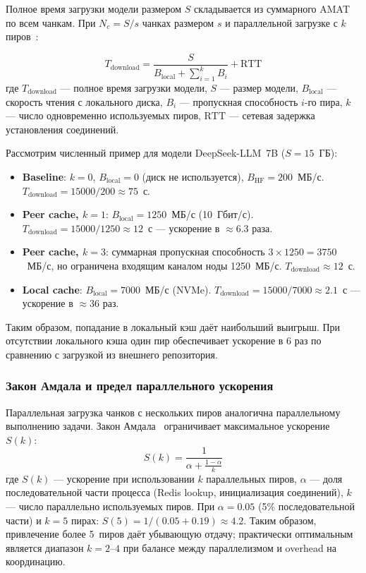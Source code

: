 Полное время загрузки модели размером $S$ складывается из суммарного AMAT по всем чанкам. При $N_c = S / s$ чанках размером $s$ и параллельной загрузке с $k$ пиров~\cite{li2020caching}:

\begin{equation}
  T_{\mathrm{download}} = \frac{S}{B_{\mathrm{local}} + \sum_{i=1}^{k} B_i} + \mathrm{RTT}
  \label{eq:p2p}
\end{equation}
где $T_{\mathrm{download}}$ --- полное время загрузки модели, $S$ --- размер модели, $B_{\mathrm{local}}$ --- скорость чтения с локального диска, $B_i$ --- пропускная способность $i$-го пира, $k$ --- число одновременно используемых пиров, $\mathrm{RTT}$ --- сетевая задержка установления соединений.

Рассмотрим численный пример для модели DeepSeek-LLM~7B ($S = 15$~ГБ):
\begin{itemize}[leftmargin=*]
  \item \textbf{Baseline}: $k = 0$, $B_{\mathrm{local}} = 0$ (диск не используется), $B_{\mathrm{HF}} = 200$~МБ/с. $T_{\mathrm{download}} = 15000 / 200 \approx 75$~с.
  \item \textbf{Peer cache, $k = 1$}: $B_{\mathrm{local}} = 1250$~МБ/с (10~Гбит/с). $T_{\mathrm{download}} = 15000 / 1250 \approx 12$~с --- ускорение в $\approx 6.3$ раза.
  \item \textbf{Peer cache, $k = 3$}: суммарная пропускная способность $3 \times 1250 = 3750$~МБ/с, но ограничена входящим каналом ноды 1250~МБ/с. $T_{\mathrm{download}} \approx 12$~с.
  \item \textbf{Local cache}: $B_{\mathrm{local}} = 7000$~МБ/с (NVMe). $T_{\mathrm{download}} = 15000 / 7000 \approx 2.1$~с --- ускорение в $\approx 36$ раз.
\end{itemize}

Таким образом, попадание в локальный кэш даёт наибольший выигрыш. При отсутствии локального кэша один пир обеспечивает ускорение в 6 раз по сравнению с загрузкой из внешнего репозитория.

\subsubsection{Закон Амдала и предел параллельного ускорения}

Параллельная загрузка чанков с нескольких пиров аналогична параллельному выполнению задачи. Закон Амдала~\cite{amdahl_law} ограничивает максимальное ускорение $S(k)$:
\begin{equation}
  S(k) = \frac{1}{\alpha + \frac{1-\alpha}{k}}
\end{equation}
где $S(k)$ --- ускорение при использовании $k$ параллельных пиров, $\alpha$ --- доля последовательной части процесса (Redis lookup, инициализация соединений), $k$ --- число параллельно используемых пиров. При $\alpha = 0.05$ (5\% последовательной части) и $k = 5$ пирах: $S(5) = 1 / (0.05 + 0.19) \approx 4.2$. Таким образом, привлечение более 5~пиров даёт убывающую отдачу; практически оптимальным является диапазон $k = 2$--$4$ при балансе между параллелизмом и overhead на координацию.

